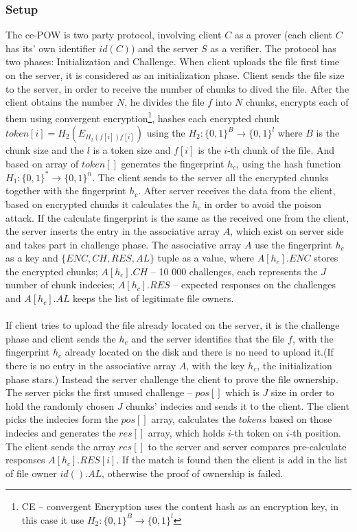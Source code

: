 \documentclass[12pt]{article}
\begin{document}
\subsubsection{Setup}
\label{subsub:setup7}
The ce-POW is two party protocol, involving client $C$ as a prover (each client $C$ has its' own identifier $id(C)$) and the server $S$ as a verifier. The protocol has two phases: Initialization  and Challenge. When client uploads the file first time on the server, it is considered as an initialization phase. Client sends the file size to the server, in order to receive the number of chunks to dived the file. After the client obtains the number $N$, he divides the file $f$ into $N$ chunks, encrypts each of them using convergent encryption\footnote{CE -- convergent Encryption uses the content hash as an encryption key, in this case it use $H_2:\{0,1\}^B\rightarrow\{0,1\}^l$}, hashes each encrypted chunk $token[i]=H_2(E_{H_2(f[i])f[i]})$ using the $H_2:\{0,1\}^B\rightarrow\{0,1\}^l$ where $B$ is the chunk size and the $l$ is a token size and $f[i]$ is the $i$-th chunk of the file. And based on array of $token[]$ generates the fingerprint $h_c$, using the hash function $H_1:\{0,1\}^*\rightarrow\{0,1\}^n$. The client sends to the server all the encrypted chunks together with the fingerprint $h_c$. After server receives the data from the client, based on encrypted chunks it calculates the $h_c$ in order to avoid the poison attack. If the calculate fingerprint is the same as the received one from the client, the server inserts the entry in the associative array $A$, which exist on server side and takes part in challenge phase.  The  associative array $A$ use the fingerprint $h_c$ as a key and  $\{ENC, CH, RES, AL\}$ tuple as a value, where $A[h_c].ENC$ stores the encrypted chunks; $A[h_c].CH$ -- 10 000 challenges, each represents the $J$ number of chunk indecies; $A[h_c].RES$ -- expected responses on the challenges and   $A[h_c].AL$ keeps the list of legitimate file owners.\\\\
If client tries to upload the file already located on the server, it is the challenge phase and client sends the $h_c$ and the server identifies that the file $f$, with the fingerprint $h_c$ already located on the disk and there is no need to upload it.(If there is no entry in the associative array $A$, with the key $h_c$, the initialization phase stars.) Instead the server challenge the client to prove the file ownership. The server picks the first unused challenge --  $pos[]$ which is $J$ size in order to hold the randomly chosen $J$ chunks' indecies and sends it to the client. The client picks the indecies form the $pos[]$  array, calculates the $tokens$ based on those indecies and generates the $res[]$ array, which holds $i$-th token on $i$-th  position. The client sends the array $res[]$ to the server and server compares  pre-calculate responses  $A[h_c].RES[i]$. If the match is found then the client is add in the list of file owner $id().AL$, otherwise the proof of ownership is failed.
\end{document}
